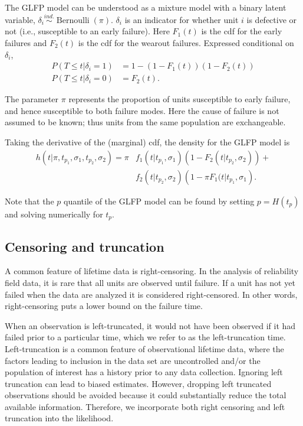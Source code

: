 \documentclass[11pt]{article}
\newcommand{\ind}{\stackrel{ind.}{\sim}}
\newcommand{\op}{\operatorname}
\begin{document}
The GLFP model can be understood as a mixture model with a binary latent variable, $\delta_i\ind \op{Bernoulli}(\pi)$. $\delta_i$ is an indicator for whether unit $i$ is defective or not (i.e., susceptible to an early failure).  Here $F_{1}(t)$ is the cdf for the early failures and $F_{2}(t)$ is
the cdf for the wearout failures. Expressed conditional on~$\delta_i$,
\begin{align*}
P(T\le t | \delta_i=1) &=  1 -(1-F_1(t))(1-F_2(t))\\
P(T\le t | \delta_i=0) &=  F_2(t).
\end{align*}

 
The parameter $\pi$ represents the proportion of units susceptible to early failure, and hence susceptible to both failure modes. Here the cause of failure is not assumed to be known; thus units from the same population are exchangeable.

Taking the derivative of the (marginal) cdf, the density for the GLFP model is
\begin{align*}
h(t|\pi, t_{p_1},\sigma_1, t_{p_2}, \sigma_2) = \pi & f_1(t|t_{p_1},\sigma_1)\left(1-F_2(t|t_{p_2},\sigma_2)\right) + \\ & f_2(t|t_{p_2},\sigma_2)\left(1-\pi F_1(t|t_{p_1},\sigma_1\right).
\end{align*}

\noindent Note that the $p$ quantile of the GLFP model can be found by setting $p=H(t_p)$ and solving numerically for $t_p$.

\subsection{Censoring and truncation}
A common feature of lifetime data is right-censoring. In the analysis of reliability field data, it is rare that all units are observed until failure. If a unit has not yet failed when the data are analyzed it is considered right-censored.  In other words, right-censoring puts a lower bound on the failure time.


When an observation is left-truncated, it would not have been observed if it had failed prior to a particular time, which we refer to as the left-truncation time.  Left-truncation is a common feature of observational lifetime data, where the factors leading to inclusion in the data set are uncontrolled and/or the population of interest has a history prior to any data collection. Ignoring left truncation can lead to biased estimates. However, dropping left truncated observations should be avoided because it could substantially reduce the total available information.  Therefore, we incorporate both right censoring and left truncation into the likelihood. 
\end{document}
